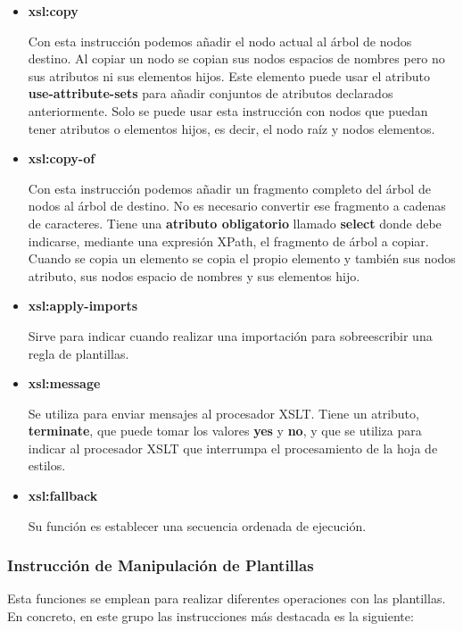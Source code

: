 \begin{itemize}
    \item \textbf{xsl:copy}

    Con esta instrucción podemos añadir el nodo actual al árbol de nodos destino. Al copiar un nodo se copian sus nodos espacios de nombres pero no sus atributos ni sus elementos hijos. Este elemento puede usar el atributo \textbf{use-attribute-sets} para añadir conjuntos de atributos declarados anteriormente. Solo se puede usar esta instrucción con nodos que puedan tener atributos o elementos hijos, es decir, el nodo raíz y nodos elementos.

    \item \textbf{xsl:copy-of}

    Con esta instrucción podemos añadir un fragmento completo del árbol de nodos al árbol de destino. No es necesario convertir ese fragmento a cadenas de caracteres. Tiene una \textbf{atributo obligatorio} llamado \textbf{select} donde debe indicarse, mediante una expresión XPath, el fragmento de árbol a copiar. Cuando se copia un elemento se copia el propio elemento y también sus nodos atributo, sus nodos espacio de nombres y sus elementos hijo.

    \item \textbf{xsl:apply-imports}

    Sirve para indicar cuando realizar una importación para sobreescribir una regla de plantillas.

    \item \textbf{xsl:message}

    Se utiliza para enviar mensajes al procesador XSLT. Tiene un atributo, \textbf{terminate}, que puede tomar los valores \textbf{yes} y \textbf{no}, y que se utiliza para indicar al procesador XSLT que interrumpa el procesamiento de la hoja de estilos.

    \item \textbf{xsl:fallback}

    Su función es establecer una secuencia ordenada de ejecución.
\end{itemize}

\subsubsection{Instrucción de Manipulación de Plantillas}
Esta funciones se emplean para realizar diferentes operaciones con las plantillas. En concreto, en este grupo las instrucciones más destacada es la siguiente:

